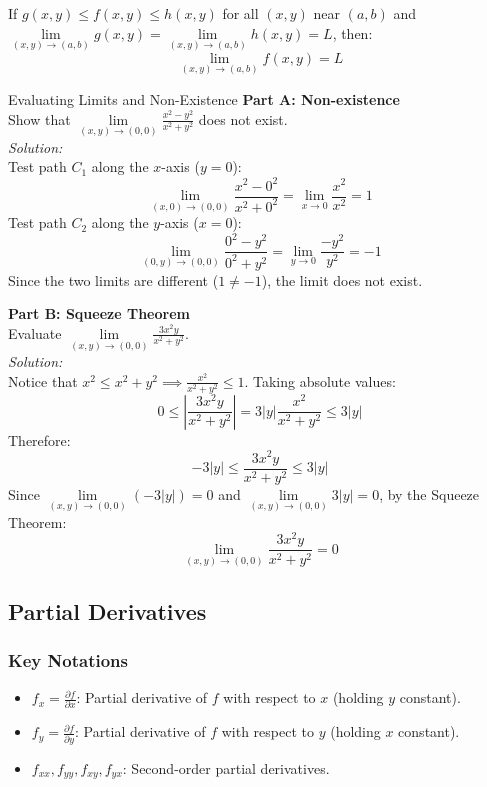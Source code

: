 \documentclass[11pt]{article}
\begin{document}
\begin{theorembox}[title={Squeeze Theorem}]
    If $g(x,y) \le f(x,y) \le h(x,y)$ for all $(x,y)$ near $(a,b)$ and $\lim\limits_{(x,y) \to (a,b)} g(x,y) = \lim\limits_{(x,y) \to (a,b)} h(x,y) = L$, then:
    \[ \lim_{(x,y) \to (a,b)} f(x,y) = L \]
\end{theorembox}

\begin{examplebox}{Evaluating Limits and Non-Existence}
    \textbf{Part A: Non-existence}\\
    Show that $\lim\limits_{(x,y) \to (0,0)} \frac{x^2 - y^2}{x^2 + y^2}$ does not exist.\\
    \textit{Solution:}\\
    Test path $C_1$ along the $x$-axis ($y = 0$):
    \[ \lim_{(x,0) \to (0,0)} \frac{x^2 - 0^2}{x^2 + 0^2} = \lim_{x \to 0} \frac{x^2}{x^2} = 1 \]
    Test path $C_2$ along the $y$-axis ($x = 0$):
    \[ \lim_{(0,y) \to (0,0)} \frac{0^2 - y^2}{0^2 + y^2} = \lim_{y \to 0} \frac{-y^2}{y^2} = -1 \]
    Since the two limits are different ($1 \neq -1$), the limit does not exist.
    
    \textbf{Part B: Squeeze Theorem}\\
    Evaluate $\lim\limits_{(x,y) \to (0,0)} \frac{3x^2y}{x^2 + y^2}$.\\
    \textit{Solution:}\\
    Notice that $x^2 \le x^2 + y^2 \implies \frac{x^2}{x^2+y^2} \le 1$. Taking absolute values:
    \[ 0 \le \left|\frac{3x^2y}{x^2 + y^2}\right| = 3|y|\frac{x^2}{x^2+y^2} \le 3|y| \]
    Therefore:
    \[ -3|y| \le \frac{3x^2y}{x^2 + y^2} \le 3|y| \]
    Since $\lim\limits_{(x,y)\to(0,0)} (-3|y|) = 0$ and $\lim\limits_{(x,y)\to(0,0)} 3|y| = 0$, by the Squeeze Theorem:
    \[ \lim_{(x,y) \to (0,0)} \frac{3x^2y}{x^2 + y^2} = 0 \]
\end{examplebox}


\subsection{Partial Derivatives}
\subsubsection*{Key Notations}
\begin{itemize}
    \item $f_x = \frac{\partial f}{\partial x}$: Partial derivative of $f$ with respect to $x$ (holding $y$ constant).
    \item $f_y = \frac{\partial f}{\partial y}$: Partial derivative of $f$ with respect to $y$ (holding $x$ constant).
    \item $f_{xx}, f_{yy}, f_{xy}, f_{yx}$: Second-order partial derivatives.
\end{itemize}
\end{document}
